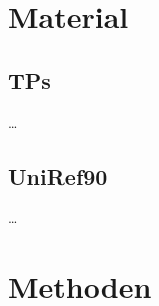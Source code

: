 \section{Material} %
\label{sec:material}
    \subsection{\aclp{TP}} %
        \label{sub:mapman}
        \dots
    \subsection{UniRef90} %
        \label{sub:uniref90}
        \dots

\section{Methoden} %
    \label{sec:methoden}
